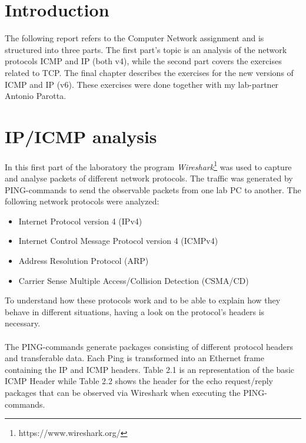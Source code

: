 \lstset{language=Java, numbers=left, numberstyle=\tiny, stepnumber=2, numbersep=5pt}
\chapter{Introduction}
\label{intro}
The following report refers to the Computer Network assignment and is structured into three parts. The first part's topic is an analysis of the network protocols ICMP and IP (both v4), while the second part covers the exercises related to TCP. The final chapter describes the exercises for the new versions of ICMP and IP (v6). These exercises were done together with my lab-partner Antonio Parotta.

\chapter{IP/ICMP analysis}
\label{ipv4}

In this first part of the laboratory the program \textit{Wireshark}\footnote{https://www.wireshark.org/} was used to capture and analyse packets of different network protocols. The traffic was generated by PING-commands to send the observable packets from one lab PC to another. The following network protocols were analyzed:
\begin{itemize}
	\item Internet Protocol version 4 (IPv4)
	\item Internet Control Message Protocol version 4 (ICMPv4)
	\item Address Resolution Protocol (ARP)
	\item Carrier Sense Multiple Access/Collision Detection (CSMA/CD)
\end{itemize}
To understand how these protocols work and to be able to explain how they behave in different situations, having a look on the protocol's headers is necessary. \\\\
The PING-commands generate packages consisting of different protocol headers and transferable data. Each Ping is transformed into an Ethernet frame containing the IP and ICMP headers. Table 2.1 is an representation of the basic ICMP Header while Table 2.2 shows the header for the echo request/reply packages that can be observed via Wireshark when executing the PING-commands.


